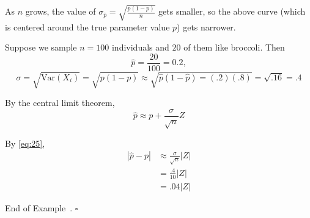 \documentclass[10pt]{article}
\theoremstyle{definition}
\newtheorem{example}[theorem]{Example}
\renewenvironment{example}
{\begin{oldexample}}
  {\par\smallskip\hfill   End of Example~\theexample. $\square$    \par\end{oldexample}}
\newcommand{\vt}{\vskip 5mm} %
\newcommand{\Fl}{\vt\noindent\textbf} %
\newcommand{\1}[1]{\textbf{1}_{\left[#1\right]}} %
\def\Var{\mathrm{Var}} %
\begin{document}
\begin{example}[Broccoli Poll]
  \begin{center}
  \end{center}
  As $n$ grows, the value of $\sigma_{\widehat{p}}=\sqrt{\frac{p(1-p)}{n}}$
  gets smaller, so the above curve (which is centered around the true
  parameter value $p$) gets narrower.

  Suppose we sample $n=100$ individuals and $20$ of them like broccoli. Then
  \begin{equation*}
    \widehat{p} = \frac{20}{100}=0.2,
  \end{equation*}
  \begin{equation}\label{eq:26}
    \sigma = \sqrt{\Var(X_{i})} = \sqrt{p(1-p)} \approx \sqrt{\widehat{p}(1-\widehat{p})=(.2)(.8)}=\sqrt{.16} = .4
  \end{equation}



  By the central limit theorem,
  \begin{equation}\label{eq:25}
    \widehat{p} \approx p + \frac{\sigma}{\sqrt{n}}Z
  \end{equation}
 

  By \cref{eq:25},
  \begin{align*}
    \left| \widehat{p}-p \right| 
    &\approx \frac{\sigma}{\sqrt{n}}|Z|\\
    &= \frac{.4}{10} |Z|\\
    &= .04 |Z|
  \end{align*}


\end{example}
\end{document}
